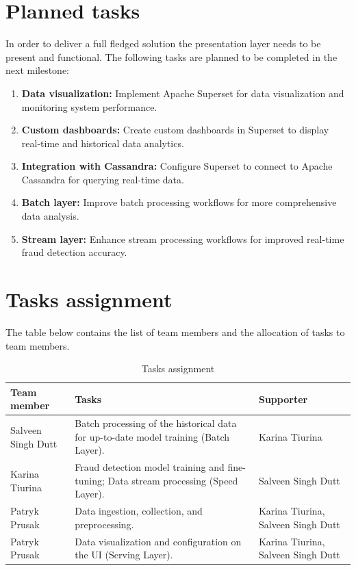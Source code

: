 \documentclass[12pt,a4paper, hidelinks]{article}
\begin{document}
\section{Planned tasks}
In order to deliver a full fledged solution the presentation layer needs to be present and functional. The following tasks are planned to be completed in the next milestone:
\begin{enumerate}
    \item \textbf{Data visualization:} Implement Apache Superset for data visualization and monitoring system performance.
    \item \textbf{Custom dashboards:} Create custom dashboards in Superset to display real-time and historical data analytics.
    \item \textbf{Integration with Cassandra:} Configure Superset to connect to Apache Cassandra for querying real-time data.
    \item \textbf{Batch layer:} Improve batch processing workflows for more comprehensive data analysis.
    \item \textbf{Stream layer:} Enhance stream processing workflows for improved real-time fraud detection accuracy.
\end{enumerate}


\section{Tasks assignment}

The table below contains the list of team members and the allocation of tasks to team members.

\begin{table}[htbp]
\centering
\begin{tabular}{|p{4cm}|p{6.5cm}|p{4cm}|}
\hline
\textbf{Team member} & \textbf{Tasks} & \textbf{Supporter} \\
\hline
Salveen Singh Dutt & Batch processing of the historical data for up-to-date model training (Batch Layer). & Karina Tiurina \\
\hline
Karina Tiurina & Fraud detection model training and fine-tuning; Data stream processing (Speed Layer). & Salveen Singh Dutt \\
\hline
Patryk Prusak & Data ingestion, collection, and preprocessing. & Karina Tiurina, Salveen Singh Dutt  \\
\hline
Patryk Prusak & Data visualization and configuration on the UI (Serving Layer). & Karina Tiurina, Salveen Singh Dutt \\
\hline
\end{tabular}
\caption{Tasks assignment}
\end{table}
\end{document}
